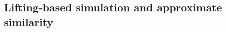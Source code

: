 \documentclass{ifacconf}
\begin{document}


\subsection{Lifting-based simulation and approximate similarity}
\end{document}
